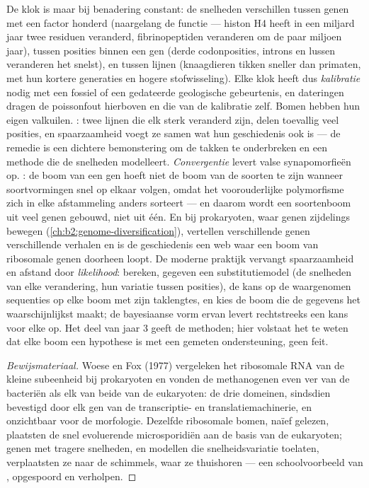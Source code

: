 \begin{proposition}\label{prop:b2:phylogenetic-trees:pitfalls}
De klok is maar bij benadering constant: de snelheden verschillen tussen
genen met een factor honderd (naargelang de functie --- histon H4 heeft in een
miljard jaar twee residuen veranderd, fibrinopeptiden veranderen om de paar
miljoen jaar), tussen posities binnen een gen (derde codonposities, introns en
lussen veranderen het snelst), en tussen lijnen (knaagdieren tikken sneller
dan primaten, met hun kortere generaties en hogere stofwisseling). Elke
klok heeft dus \emph{kalibratie} nodig met een fossiel of een gedateerde
geologische gebeurtenis, en dateringen dragen de poissonfout hierboven en die
van de kalibratie zelf. Bomen hebben hun eigen valkuilen. \emph{}: twee lijnen die elk sterk veranderd zijn, delen toevallig veel
posities, en spaarzaamheid voegt ze samen wat hun geschiedenis ook is --- de
remedie is een dichtere bemonstering om de takken te onderbreken en een
methode die de snelheden modelleert. \emph{Convergentie} levert valse
synapomorfieën op. \emph{}: de boom van een gen hoeft
niet de boom van de soorten te zijn wanneer soortvormingen snel op elkaar
volgen, omdat het voorouderlijke polymorfisme zich in elke afstammeling anders
sorteert --- en daarom wordt een soortenboom uit veel genen gebouwd, niet uit
één. En bij prokaryoten, waar genen zijdelings bewegen
(\cref{ch:b2:genome-diversification}), vertellen verschillende genen
verschillende verhalen en is de geschiedenis een web waar een boom van
ribosomale genen doorheen loopt. De moderne praktijk vervangt spaarzaamheid en
afstand door \emph{likelihood}: bereken, gegeven een substitutiemodel (de
snelheden van elke verandering, hun variatie tussen posities), de kans op de
waargenomen sequenties op elke boom met zijn taklengtes, en kies de boom die de
gegevens het waarschijnlijkst maakt; de bayesiaanse vorm ervan levert
rechtstreeks een kans voor elke  op.
Het deel van jaar 3 geeft de methoden; hier volstaat het te weten dat
elke boom een hypothese is met een gemeten ondersteuning, geen feit.
\end{proposition}
\begin{proof}[Bewijsmateriaal]
Woese en Fox (1977) vergeleken het ribosomale RNA van de kleine subeenheid bij
prokaryoten en vonden de methanogenen even ver van de bacteriën als elk van
beide van de eukaryoten: de drie domeinen, sindsdien bevestigd door elk gen van
de transcriptie- en translatiemachinerie, en onzichtbaar voor de morfologie.
Dezelfde ribosomale bomen, naïef gelezen, plaatsten de snel evoluerende
microsporidiën aan de basis van de eukaryoten; genen met tragere snelheden, en
modellen die snelheidsvariatie toelaten, verplaatsten ze naar de schimmels,
waar ze thuishoren --- een schoolvoorbeeld van ,
opgespoord en verholpen.
\end{proof}

